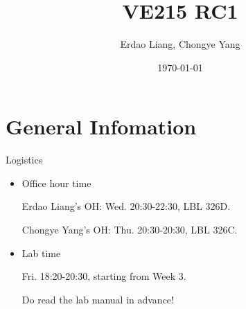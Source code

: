 \documentclass{beamer}
\title[VE215 RC1]{VE215 RC1}
\author{Erdao Liang, Chongye Yang}
\institute[UM-SJTU JI] 
{UM-SJTU JI}
\date{\today}
\begin{document}

\begin{frame}
\titlepage %
\end{frame}


\section{General Infomation}

\begin{frame}{Logistics}
    \begin{itemize}
        \item Office hour time

        Erdao Liang's OH: Wed. 20:30-22:30, LBL 326D.
        
        Chongye Yang's OH: Thu. 20:30-20:30, LBL 326C.

        
        \item Lab time
        
        Fri. 18:20-20:30, starting from Week 3.

        Do read the lab manual in advance!
        
    \end{itemize}
\end{frame}
\end{document}
